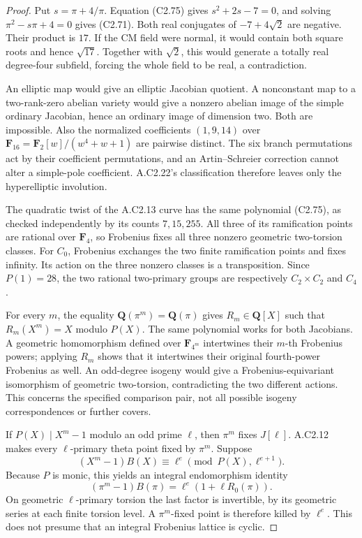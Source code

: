 \begin{proof}
Put $s=\pi+4/\pi$. Equation (C2.75) gives
$s^2+2s-7=0$, and solving
$\pi^2-s\pi+4=0$ gives (C2.71).
Both real conjugates of $-7+4\sqrt2$ are
negative. Their product is $17$. If the CM
field were normal, it would contain both
square roots and hence $\sqrt{17}$.
Together with $\sqrt2$, this would generate
a totally real degree-four subfield, forcing
the whole field to be real, a contradiction.

An elliptic map would give an elliptic
Jacobian quotient. A nonconstant map to a
two-rank-zero abelian variety would give a
nonzero abelian image of the simple ordinary
Jacobian, hence an ordinary image of dimension
two. Both are impossible. Also the normalized
coefficients $(1,9,14)$ over
$\mathbf F_{16}=\mathbf F_2[w]/(w^4+w+1)$
are pairwise distinct. The six branch
permutations act by their coefficient
permutations, and an Artin--Schreier correction
cannot alter a simple-pole coefficient.
A.C2.22's classification therefore leaves
only the hyperelliptic involution.

The quadratic twist of the A.C2.13 curve
has the same polynomial (C2.75), as checked
independently by its counts $7,15,255$.
All three of its ramification points are
rational over $\mathbf F_4$, so Frobenius
fixes all three nonzero geometric two-torsion
classes. For $C_0$, Frobenius exchanges the
two finite ramification points and fixes
infinity. Its action on the three nonzero
classes is a transposition. Since $P(1)=28$,
the two rational two-primary groups are
respectively $C_2\times C_2$ and $C_4$.

For every $m$, the equality
$\mathbf Q(\pi^m)=\mathbf Q(\pi)$ gives
$R_m\in\mathbf Q[X]$ such that
$R_m(X^m)=X$ modulo $P(X)$.
The same polynomial works for both Jacobians.
A geometric homomorphism defined over
$\mathbf F_{4^m}$ intertwines their $m$-th
Frobenius powers; applying $R_m$ shows that
it intertwines their original fourth-power
Frobenius as well. An odd-degree isogeny
would give a Frobenius-equivariant isomorphism
of geometric two-torsion, contradicting the
two different actions. This concerns the
specified comparison pair, not all possible
isogeny correspondences or further covers.

If $P(X)\mid X^m-1$ modulo an odd prime
$\ell$, then $\pi^m$ fixes $J[\ell]$.
A.C2.12 makes every $\ell$-primary theta
point fixed by $\pi^m$. Suppose
\[
 (X^m-1)B(X)\equiv\ell^e
                  \pmod{P(X),\ell^{e+1}}.              \tag{C2.77}
\]
Because $P$ is monic, this yields an integral
endomorphism identity
\[
 (\pi^m-1)B(\pi)=\ell^e(1+\ell R_0(\pi)).
\]
On geometric $\ell$-primary torsion the
last factor is invertible, by its geometric
series at each finite torsion level. A
$\pi^m$-fixed point is therefore killed by
$\ell^e$. This does not presume that an
integral Frobenius lattice is cyclic.


\end{proof}

